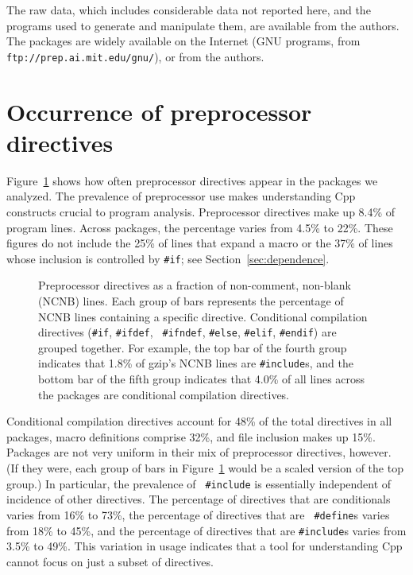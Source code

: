 \documentclass[10pt]{article}
\newcommand{\captionsmall}[1]{\caption[]{\small #1}}
\begin{document}
The raw data, which includes considerable data not reported here, and the
programs used to generate and manipulate them, are available from the
authors.  The packages are widely available on the Internet (GNU programs,
from {\tt ftp://prep.ai.mit.edu/gnu/}), or from the authors.


\section{Occurrence of preprocessor directives}
\label{sec:directives}
\label{sec:first-content-section}



Figure~\ref{fig:directives-breakdown} shows how often preprocessor
directives appear in the packages we analyzed.  The prevalence of
preprocessor use makes understanding Cpp constructs crucial to program
analysis.  Preprocessor directives make up 8.4\% of program lines.
Across packages, the percentage varies from 4.5\% to 22\%.  These
figures do not include the 25\% of lines that expand a macro or the
37\% of lines whose inclusion is controlled by {\tt \#if}; see
Section~\ref{sec:dependence}.

\begin{figure}
\centerline{}
\captionsmall{Preprocessor directives as a fraction of non-comment,
  non-blank (NCNB) lines.  Each group of bars represents the percentage of
  NCNB lines containing a specific directive.
  Conditional compilation directives ({\tt \#if}, {\tt \#ifdef}, {\tt
  \#ifndef}, {\tt \#else}, {\tt \#elif}, {\tt \#endif}) are grouped
  together.  For example, the top bar of the fourth group indicates that
  1.8\% of gzip's NCNB lines are {\tt \#include}s, and the bottom bar of the
  fifth group indicates that 4.0\% of all lines across the packages are
  conditional compilation directives.}
\label{fig:directives-breakdown}
\end{figure}





Conditional compilation directives account for 48\% of the total
directives in all packages, macro definitions comprise 32\%, and file
inclusion makes up 15\%.  Packages are not very uniform in their mix
of preprocessor directives, however.  (If they were, each group of
bars in Figure~\ref{fig:directives-breakdown} would be a scaled
version of the top group.)  In particular, the prevalence of {\tt
\#include} is essentially independent of incidence of other
directives.  The percentage of directives that are conditionals varies
from 16\% to 73\%, the percentage of directives that are {\tt
\#define}s varies from 18\% to 45\%, and the percentage of directives
that are {\tt \#include}s varies from 3.5\% to 49\%.  This variation
in usage indicates that a tool for understanding Cpp cannot focus on
just a subset of directives.
\end{document}
